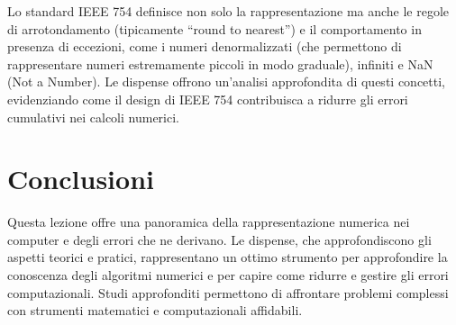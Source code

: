 \documentclass[letterpaper,12pt]{article}
\begin{document}
        Lo standard IEEE 754 definisce non solo la rappresentazione ma anche le regole di arrotondamento (tipicamente ``round to nearest'') e il comportamento in presenza di eccezioni, come i numeri denormalizzati (che permettono di rappresentare numeri estremamente piccoli in modo graduale), infiniti e NaN (Not a Number). Le dispense offrono un’analisi approfondita di questi concetti, evidenziando come il design di IEEE 754 contribuisca a ridurre gli errori cumulativi nei calcoli numerici.

\section{Conclusioni}
Questa lezione offre una panoramica della rappresentazione numerica nei computer e degli errori che ne derivano. Le dispense, che approfondiscono gli aspetti teorici e pratici, rappresentano un ottimo strumento per approfondire la conoscenza degli algoritmi numerici e per capire come ridurre e gestire gli errori computazionali. Studi approfonditi permettono di affrontare problemi complessi con strumenti matematici e computazionali affidabili.
\end{document}
